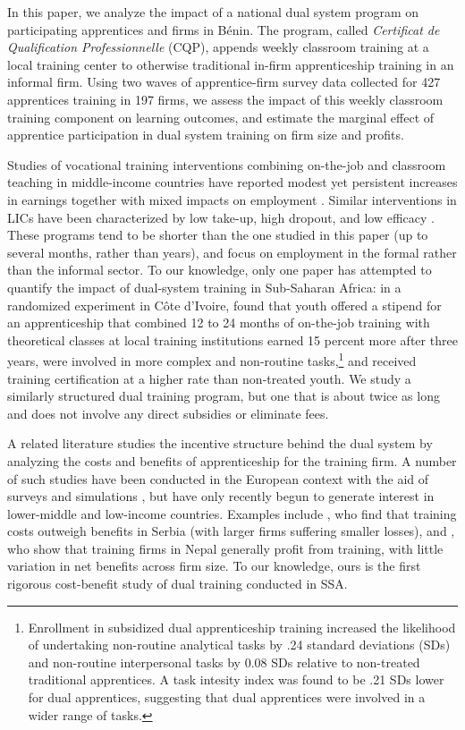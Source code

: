 \documentclass[
  a4paper, twoside, 12pt]{book}
\begin{document}
In this paper, we analyze the impact of a national dual system program on participating apprentices and firms in Bénin. The program, called \emph{Certificat de Qualification Professionnelle} (CQP), appends weekly classroom training at a local training center to otherwise traditional in-firm apprenticeship training in an informal firm. Using two waves of apprentice-firm survey data collected for 427 apprentices training in 197 firms, we assess the impact of this weekly classroom training component on learning outcomes, and estimate the marginal effect of apprentice participation in dual system training on firm size and profits.

Studies of vocational training interventions combining on-the-job and classroom teaching in middle-income countries have reported modest yet persistent increases in earnings together with mixed impacts on employment \autocite{card2011,attanasio2011,ibarraran2014,alzua2016,attanasio2017,ibarraran2019}. Similar interventions in LICs have been characterized by low take-up, high dropout, and low efficacy \autocites[see][]{blattman2015,ghisletta2021}[ for an overview]{tripney2013}. These programs tend to be shorter than the one studied in this paper (up to several months, rather than years), and focus on employment in the formal rather than the informal sector. To our knowledge, only one paper has attempted to quantify the impact of dual-system training in Sub-Saharan Africa: in a randomized experiment in Côte d'Ivoire, \textcite{crepon2019} found that youth offered a stipend for an apprenticeship that combined 12 to 24 months of on-the-job training with theoretical classes at local training institutions earned 15 percent more after three years, were involved in more complex and non-routine tasks,\footnote{Enrollment in subsidized dual apprenticeship training increased the likelihood of undertaking non-routine analytical tasks by .24 standard deviations (SDs) and non-routine interpersonal tasks by 0.08 SDs relative to non-treated traditional apprentices. A task intesity index was found to be .21 SDs lower for dual apprentices, suggesting that dual apprentices were involved in a wider range of tasks.} and received training certification at a higher rate than non-treated youth. We study a similarly structured dual training program, but one that is about twice as long and does not involve any direct subsidies or eliminate fees.

A related literature studies the incentive structure behind the dual system by analyzing the costs and benefits of apprenticeship for the training firm. A number of such studies have been conducted in the European context with the aid of surveys and simulations \autocites[see, e.g.,][]{muhlemann2016,muhlemann2019,muhlemann2014}, but have only recently begun to generate interest in lower-middle and low-income countries. Examples include \textcite{bolli2021}, who find that training costs outweigh benefits in Serbia (with larger firms suffering smaller losses), and \textcite{bolli2020}, who show that training firms in Nepal generally profit from training, with little variation in net benefits across firm size. To our knowledge, ours is the first rigorous cost-benefit study of dual training conducted in SSA.
\end{document}

